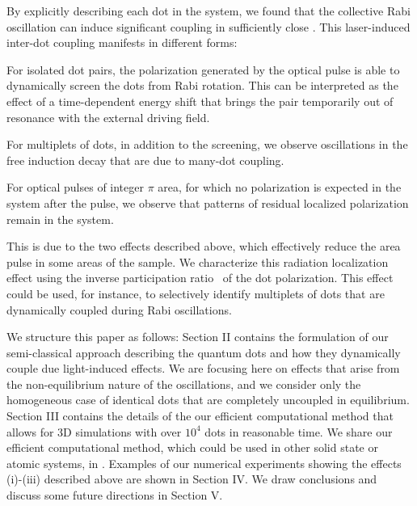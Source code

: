 By explicitly describing each dot in the system, we found that the collective Rabi oscillation can induce significant coupling in sufficiently close \qds{}.
This laser-induced inter-dot coupling manifests in different forms:
\begin{inparaenum}[(i)]
  \item For isolated dot pairs, the polarization generated by the optical pulse is able to dynamically screen the dots from Rabi rotation.
  This can be interpreted as the effect of a time-dependent energy shift that brings the pair temporarily out of resonance with the external driving field.
  \item For multiplets of dots, in addition to the screening, we observe oscillations in the free induction decay that are due to many-dot coupling.
  \item For optical pulses of integer $\pi$ area, for which no polarization is expected in the system after the pulse, we observe that patterns of residual localized polarization remain in the system.
\end{inparaenum}
This is due to the two effects described above, which effectively reduce the area pulse in some areas of the sample.
We characterize this radiation localization effect using the inverse participation ratio~\cite{Schwartz2007} of the dot polarization.
This effect could be used, for instance, to selectively identify multiplets of dots that are dynamically coupled during Rabi oscillations.

We structure this paper as follows: Section II contains the formulation of our semi-classical approach describing the quantum dots and how they dynamically couple due light-induced effects.
We are focusing here on effects that arise from the non-equilibrium nature of the oscillations, and we consider only the homogeneous case of identical dots that are completely uncoupled in equilibrium.
Section III contains the details of the our efficient computational method that allows for 3D simulations with over $10^4$ dots in reasonable time.
We share our efficient computational method, which could be used in other solid state or atomic systems, in \cite{githubpage}.
Examples of our numerical experiments showing the effects (i)-(iii) described above are shown in Section IV.
We draw conclusions and discuss some future directions in Section V.
